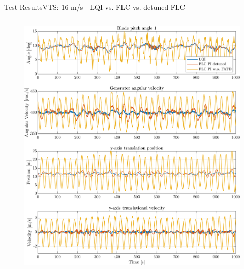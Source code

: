 \begin{frame}{Test Results}{VTS: 16 m/s - LQI vs. FLC vs. detuned FLC}
\begin{columns}
\begin{column}{.75\linewidth}
\begin{figure}[h]
				\includegraphics[width=0.9\linewidth]{../Graphics/TestResults/VTSplotting/3_th_w_py_vy.png}
				\label{fig:vts_3_th_w_py_vy}
			\end{figure}
		\end{column}
	\end{columns}
\end{frame}



